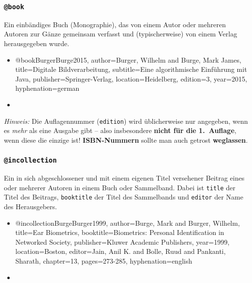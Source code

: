 \subsubsection{\texttt{@book}}
\label{sec:@book}
Ein einbändiges Buch (Monographie), das von einem Autor oder mehreren Autoren zur Gänze gemeinsam verfasst und (typischerweise) von einem Verlag herausgegeben wurde.
% 
\begin{itemize}
\item[] 
\begin{GenericCode}[numbers=none]
@book{BurgerBurge2015,
  author={Burger, Wilhelm and Burge, Mark James},
  title={Digitale Bildverarbeitung},
  subtitle={Eine algorithmische Einführung mit Java},
  publisher={Springer-Verlag},
  location={Heidelberg},
  edition={3},
  year={2015},
  hyphenation={german}
}
\end{GenericCode}
\item[\cite{BurgerBurge2015}] 
\end{itemize}
%
\emph{Hinweis:} Die Auflagennummer (\texttt{edition}) wird üblicherweise nur angegeben, 
wenn es \emph{mehr} als eine Ausgabe gibt -- also insbesondere \textbf{nicht für die 1.\ Auflage}, 
wenn diese die einzige ist!
\textbf{ISBN-Nummern} sollte man auch getrost \textbf{weglassen}.


\subsubsection{\texttt{@incollection}}
\label{sec:@incollection}
Ein in sich abgeschlossener und mit einem eigenen Titel versehener
Beitrag eines oder mehrerer Autoren in einem Buch oder Sammelband.
Dabei ist \texttt{title} der Titel des Beitrags, \texttt{booktitle} der Titel des Sammelbands und
\texttt{editor} der Name des Herausgebers.
%
\begin{itemize}
\item[] 
\begin{GenericCode}[numbers=none]
@incollection{BurgeBurger1999,
  author={Burge, Mark and Burger, Wilhelm},
  title={Ear Biometrics},
  booktitle={Biometrics: Personal Identification in Networked Society},
  publisher={Kluwer Academic Publishers},
  year={1999},
  location={Boston},
  editor={Jain, Anil K. and Bolle, Ruud and Pankanti, Sharath},
  chapter={13},
  pages={273-285},
  hyphenation={english}
}
\end{GenericCode}
\item[\cite{BurgeBurger1999}] 
\end{itemize}



